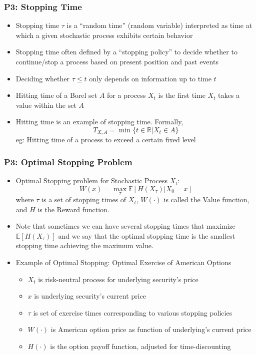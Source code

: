 \documentclass[handout]{beamer}
\begin{document}
\begin{frame}
\frametitle{P3: Stopping Time}
\pause
\begin{itemize}[<+->]
\item Stopping time $\tau$ is a ``random time'' (random variable) interpreted as time at which a given stochastic process exhibits certain behavior
\item Stopping time often defined by a ``stopping policy'' to decide whether to continue/stop a process based on present position and past events
\item Deciding whether $\tau \leq t$ only depends on information up to time $t$
\item Hitting time of a Borel set $A$ for a process $X_t$ is the first time $X_t$ takes a value within the set $A$
\item Hitting time is an example of stopping time. Formally, 
$$T_{X,A} = \min \{t \in \mathbb{R} | X_t \in A\}$$
eg: Hitting time of a process to exceed a certain fixed level
\end{itemize}
\end{frame}

\begin{frame}
\frametitle{P3: Optimal Stopping Problem}
\pause
\begin{itemize}[<+->]
\item Optimal Stopping problem for Stochastic Process $X_t$: 
$$W(x) = \max_{\tau} \mathbb{E}[H(X_{\tau})|X_0 = x]$$
 where $\tau$ is a set of stopping times of $X_t$, $W(\cdot)$ is called the Value function, and $H$ is the Reward function.
\item Note that sometimes we can have several stopping times that maximize $\mathbb{E}[H(X_{\tau})]$ and we say that the optimal stopping time
is the smallest stopping time achieving the maximum value.
\item Example of Optimal Stopping: Optimal Exercise of American Options
\begin{itemize}
\item $X_t$ is risk-neutral process for underlying security's price
\item $x$ is underlying security's current price
\item $\tau$ is set of exercise times corresponding to various stopping policies
\item $W(\cdot)$ is American option price as function of underlying's current price
\item $H(\cdot)$ is the option payoff function, adjusted for time-discounting
\end{itemize}
\end{itemize}
\end{frame}
\end{document}
